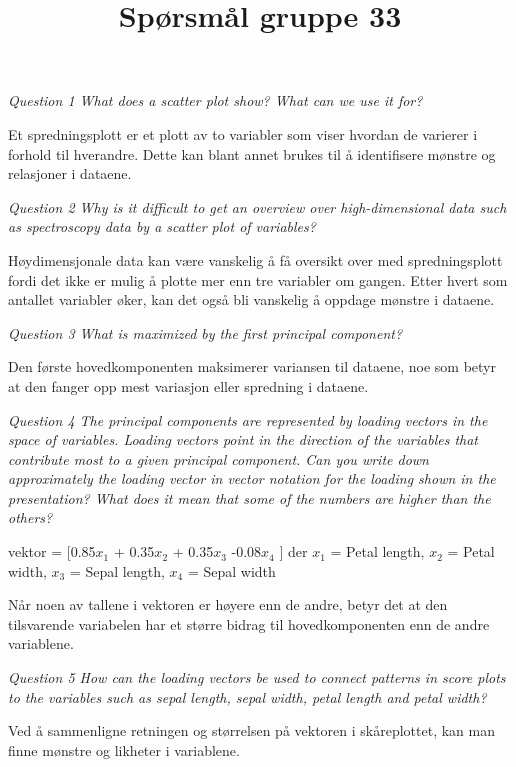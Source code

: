 \documentclass[onecolumn, 11pt]{article} %
\begin{document}
\title{Spørsmål gruppe 33}
\maketitle

\textit{Question 1 What does a scatter plot show? What can we use it for?}

Et spredningsplott er et plott av to variabler som viser hvordan de varierer i forhold til hverandre. Dette kan blant annet brukes til å identifisere mønstre og relasjoner i dataene.

\bigskip

\textit{Question 2 Why is it difficult to get an overview over high-dimensional data such as spectroscopy
data by a scatter plot of variables?}

Høydimensjonale data kan være vanskelig å få oversikt over med spredningsplott fordi det ikke er mulig å plotte mer enn tre variabler om gangen. Etter hvert som antallet variabler øker, kan det også bli vanskelig å oppdage mønstre i dataene.

\bigskip

\textit{Question 3 What is maximized by the first principal component?}

Den første hovedkomponenten maksimerer variansen til dataene, noe som betyr at den fanger opp mest variasjon eller spredning i dataene.

\bigskip

\textit{Question 4 The principal components are represented by loading vectors in the space of variables.
Loading vectors point in the direction of the variables that contribute most to a given principal
component. Can you write down approximately the loading vector in vector notation for the loading
shown in the presentation? What does it mean that some of the numbers are higher than the others?}


vektor = [0.85$x_1$ + 0.35$x_2$ + 0.35$x_3$ -0.08$x_4$ ] der $x_1$ = Petal length, $x_2$ = Petal width, $x_3$ = Sepal length, $x_4$ = Sepal width

Når noen av tallene i vektoren er høyere enn de andre, betyr det at den tilsvarende variabelen har et større bidrag til hovedkomponenten enn de andre variablene.

\bigskip

\textit{Question 5 How can the loading vectors be used to connect patterns in score plots to the variables
such as sepal length, sepal width, petal length and petal width?}

Ved å sammenligne retningen og størrelsen på vektoren i skåreplottet, kan man finne mønstre og likheter i variablene.
\end{document}
